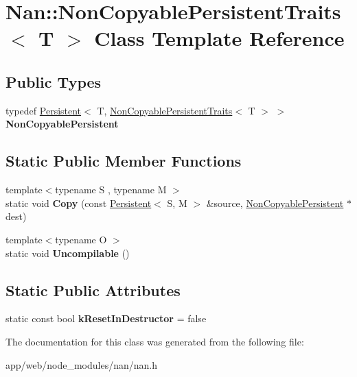 \hypertarget{class_nan_1_1_non_copyable_persistent_traits}{}\section{Nan\+:\+:Non\+Copyable\+Persistent\+Traits$<$ T $>$ Class Template Reference}
\label{class_nan_1_1_non_copyable_persistent_traits}
\subsection*{Public Types}
\begin{DoxyCompactItemize}
\item 
\mbox{\label{class_nan_1_1_non_copyable_persistent_traits_a19cc5969a70d678d9570042dd5932903}} 
typedef \hyperlink{class_nan_1_1_persistent}{Persistent}$<$ T, \hyperlink{class_nan_1_1_non_copyable_persistent_traits}{Non\+Copyable\+Persistent\+Traits}$<$ T $>$ $>$ {\bfseries Non\+Copyable\+Persistent}
\end{DoxyCompactItemize}
\subsection*{Static Public Member Functions}
\begin{DoxyCompactItemize}
\item 
\mbox{\label{class_nan_1_1_non_copyable_persistent_traits_aa2275e3647ed22c69693e66fbafe27ac}} 
{\footnotesize template$<$typename S , typename M $>$ }\\static void {\bfseries Copy} (const \hyperlink{class_nan_1_1_persistent}{Persistent}$<$ S, M $>$ \&source, \hyperlink{class_nan_1_1_persistent}{Non\+Copyable\+Persistent} $\ast$dest)
\item 
\mbox{\label{class_nan_1_1_non_copyable_persistent_traits_a24b901f75e100e2a3c27aca90b676dac}} 
{\footnotesize template$<$typename O $>$ }\\static void {\bfseries Uncompilable} ()
\end{DoxyCompactItemize}
\subsection*{Static Public Attributes}
\begin{DoxyCompactItemize}
\item 
\mbox{\label{class_nan_1_1_non_copyable_persistent_traits_a0032ce5de6bfe30dc245c7d5ccbc1469}} 
static const bool {\bfseries k\+Reset\+In\+Destructor} = false
\end{DoxyCompactItemize}


The documentation for this class was generated from the following file\+:\begin{DoxyCompactItemize}
\item 
app/web/node\+\_\+modules/nan/nan.\+h\end{DoxyCompactItemize}
